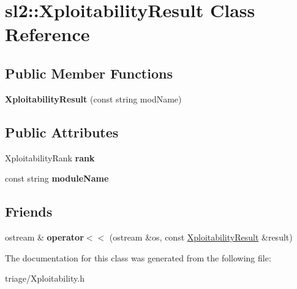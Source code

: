 \hypertarget{classsl2_1_1_xploitability_result}{}\section{sl2\+:\+:Xploitability\+Result Class Reference}
\label{classsl2_1_1_xploitability_result}
\subsection*{Public Member Functions}
\begin{DoxyCompactItemize}
\item 
\mbox{\label{classsl2_1_1_xploitability_result_a878355eba3cfd65a6d5824943e6a8821}} 
{\bfseries Xploitability\+Result} (const string mod\+Name)
\end{DoxyCompactItemize}
\subsection*{Public Attributes}
\begin{DoxyCompactItemize}
\item 
\mbox{\label{classsl2_1_1_xploitability_result_a178834fc87bb14e741a51db280e748e3}} 
Xploitability\+Rank {\bfseries rank}
\item 
\mbox{\label{classsl2_1_1_xploitability_result_a8cd34c9ecbd279b5804df134f5bc29ba}} 
const string {\bfseries module\+Name}
\end{DoxyCompactItemize}
\subsection*{Friends}
\begin{DoxyCompactItemize}
\item 
\mbox{\label{classsl2_1_1_xploitability_result_aa822d3baa333b28de5d71645d3b62eb5}} 
ostream \& {\bfseries operator$<$$<$} (ostream \&os, const \mbox{\hyperlink{classsl2_1_1_xploitability_result}{Xploitability\+Result}} \&result)
\end{DoxyCompactItemize}


The documentation for this class was generated from the following file\+:\begin{DoxyCompactItemize}
\item 
triage/Xploitability.\+h\end{DoxyCompactItemize}
